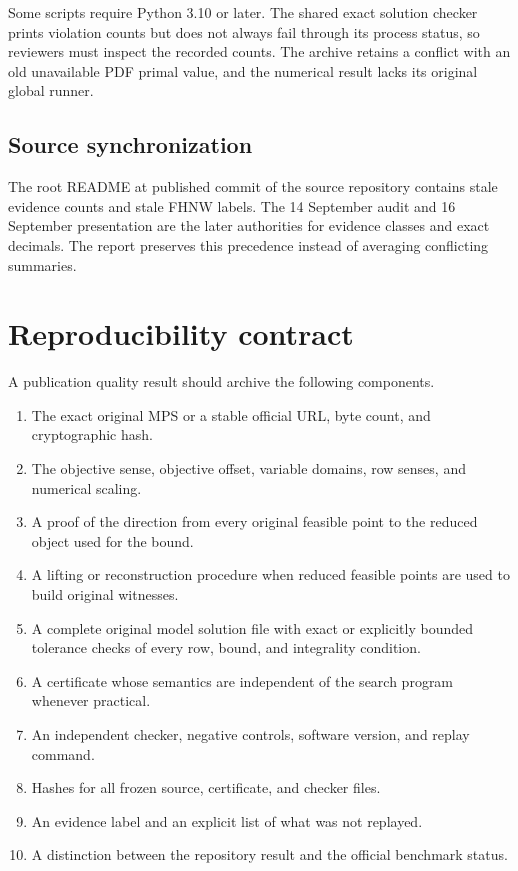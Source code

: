 \documentclass[11pt,letterpaper]{article}
\begin{document}
Some scripts require Python 3.10 or later. The shared exact solution checker prints violation counts but does not always fail through its process status, so reviewers must inspect the recorded counts. The \texttt{} archive retains a conflict with an old unavailable PDF primal value, and the \texttt{} numerical result lacks its original global runner.

\subsection{Source synchronization}

The root README at published commit \texttt{} of the source \texttt{} repository contains stale evidence counts and stale FHNW labels. The 14 September audit and 16 September presentation are the later authorities for evidence classes and exact decimals. The report preserves this precedence instead of averaging conflicting summaries.

\section{Reproducibility contract}

A publication quality result should archive the following components.

\begin{enumerate}
\item The exact original MPS or a stable official URL, byte count, and cryptographic hash.
\item The objective sense, objective offset, variable domains, row senses, and numerical scaling.
\item A proof of the direction from every original feasible point to the reduced object used for the bound.
\item A lifting or reconstruction procedure when reduced feasible points are used to build original witnesses.
\item A complete original model solution file with exact or explicitly bounded tolerance checks of every row, bound, and integrality condition.
\item A certificate whose semantics are independent of the search program whenever practical.
\item An independent checker, negative controls, software version, and replay command.
\item Hashes for all frozen source, certificate, and checker files.
\item An evidence label and an explicit list of what was not replayed.
\item A distinction between the repository result and the official benchmark status.
\end{enumerate}
\end{document}
